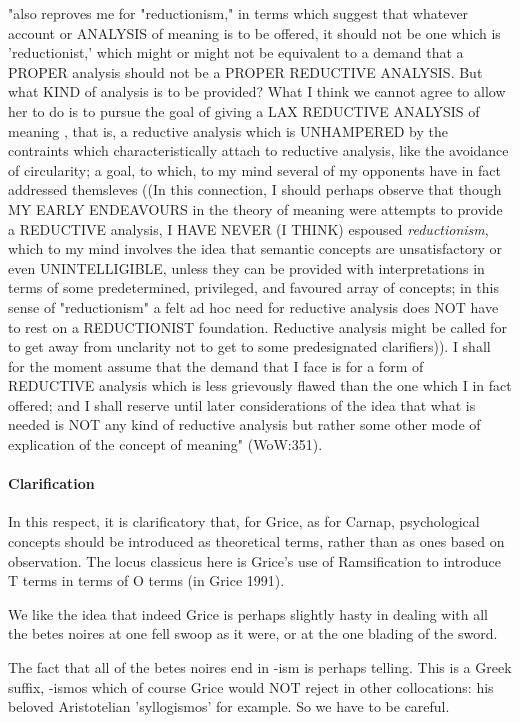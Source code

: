 \documentclass[10pt,titlepage]{book}
\begin{document}
"also reproves me for "reductionism," in terms which suggest that  whatever 
account or ANALYSIS of meaning is to be offered, it should not be one  
which is 'reductionist,' which might or might not be equivalent to a demand that 
 a PROPER analysis should not be a PROPER REDUCTIVE ANALYSIS. But what KIND 
of  analysis is to be provided? What I think we cannot agree to allow her 
to do is  to pursue the goal of giving a LAX REDUCTIVE ANALYSIS of meaning , 
that is, a  reductive analysis which is UNHAMPERED by the contraints which  
characteristically attach to reductive analysis, like the avoidance of  
circularity; a goal, to which, to my mind several of my opponents have in fact  
addressed themsleves ((In this connection, I should perhaps observe that 
though  MY EARLY ENDEAVOURS in the theory of meaning were attempts to provide a 
 REDUCTIVE analysis, I HAVE NEVER (I THINK) espoused {\it reductionism}, which 
to my  mind involves the idea that semantic concepts are unsatisfactory or 
even  UNINTELLIGIBLE, unless they can be provided with interpretations in 
terms of  some predetermined, privileged, and favoured array of concepts; in 
this sense of  "reductionism" a felt ad hoc need for reductive analysis does 
NOT have to rest  on a REDUCTIONIST foundation. Reductive analysis might be 
called for to get away  from unclarity not to get to some predesignated 
clarifiers)). I shall for the  moment assume that the demand that I face is for a 
form of REDUCTIVE analysis  which is less grievously flawed than the one 
which I in fact offered; and I  shall reserve until later considerations of 
the idea that what is needed is NOT  any kind of reductive analysis but rather 
some other mode of explication of the  concept of meaning" (WoW:351).

\paragraph{Clarification}
 
In this respect, it is clarificatory that, for Grice, as for Carnap,  
psychological concepts should be introduced as theoretical terms, rather than  
as ones based on observation. The locus classicus here is Grice's use of  
Ramsification to introduce T terms in terms of O terms (in Grice 1991). 

We like the idea  that indeed Grice is perhaps slightly hasty in dealing 
with all the betes noires  at one fell swoop as it were, or at the one blading 
of the sword. 
 
The fact that all  of the betes noires end in -ism is perhaps telling. This 
is a Greek suffix,  -ismos which of course Grice would NOT reject in other 
collocations: his beloved  Aristotelian 'syllogismos' for example. So we 
have to be  careful.
 
\end{document}
